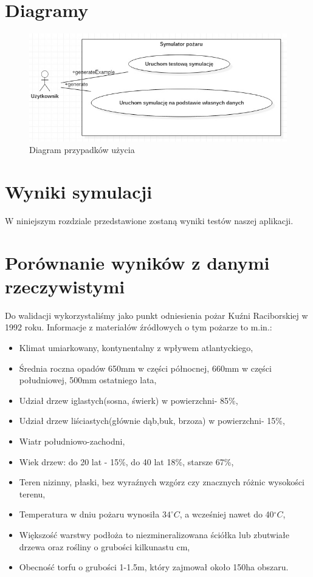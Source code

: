 \documentclass[a4paper, 11pt]{article}
\begin{document}
	\section*{Diagramy}
	\indent
	
	\begin{figure}[H]
		\centerline{\includegraphics[scale=0.9]{usecase1}}
		\raggedright{	\caption{Diagram przypadków użycia}}
	\end{figure}
	
	\section{Wyniki symulacji}
	\indent
	W niniejszym rozdziale przedstawione zostaną wyniki testów naszej aplikacji.
	\section*{Porównanie wyników z danymi rzeczywistymi}
	\indent
	
	Do walidacji wykorzystaliśmy jako punkt odniesienia pożar Kuźni Raciborskiej w 1992 roku.
	Informacje z materiałów źródłowych o tym pożarze to m.in.:
	\begin{itemize}
		\item Klimat umiarkowany, kontynentalny z wpływem atlantyckiego,
		\item Średnia roczna opadów 650mm w części północnej, 660mm w części południowej, 500mm ostatniego lata,
		\item Udział drzew iglastych(sosna, świerk) w powierzchni- 85\%,
		\item Udział drzew liściastych(głównie dąb,buk, brzoza) w powierzchni- 15\%,
		\item Wiatr południowo-zachodni,
		\item Wiek drzew: do 20 lat - 15\%, do 40 lat 18\%, starsze 67\%,
		\item Teren nizinny, płaski, bez wyraźnych wzgórz czy znacznych różnic wysokości terenu,
		\item Temperatura w dniu pożaru wynosiła $34^\circ C$, a wcześniej nawet do 40$^\circ C$,
		\item Większość warstwy podłoża to niezmineralizowana ściółka lub zbutwiałe drzewa oraz rośliny o grubości kilkunastu cm,
		\item Obecność torfu o grubości 1-1.5m, który zajmował około 150ha obszaru.
	\end{itemize}
\end{document}
